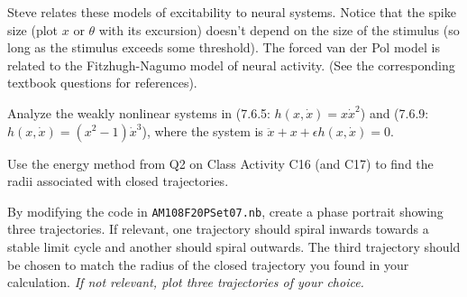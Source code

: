 \documentclass[12pt,letterpaper,noanswers]{exam}
\begin{document}
\begin{questions}
Steve relates these models of excitability to neural systems.  Notice that the spike size (plot $x$ or $\theta$ with its excursion) doesn't depend on the size of the stimulus (so long as the stimulus exceeds some threshold).  The forced van der Pol model is related to the Fitzhugh-Nagumo model of neural activity.  (See the corresponding textbook questions for references).

\item Analyze the weakly nonlinear systems in (7.6.5: $h(x,\dot x) = x\dot{x}^2$) and (7.6.9: $h(x,\dot x) = (x^2-1)\dot{x}^3$), where the system is $\ddot x + x + \epsilon h(x,\dot x) = 0$.
\begin{parts}
\item Use the energy method from Q2 on Class Activity C16 (and C17) to find the radii associated with closed trajectories.
\item By modifying the code in \texttt{AM108F20PSet07.nb}, create a phase portrait showing three trajectories.  If relevant, one trajectory should spiral inwards towards a stable limit cycle and another should spiral outwards.  The third trajectory should be chosen to match the radius of the closed trajectory you found in your calculation.  \emph{If not relevant, plot three trajectories of your choice.}


\end{parts}
\end{questions}
\end{document}

